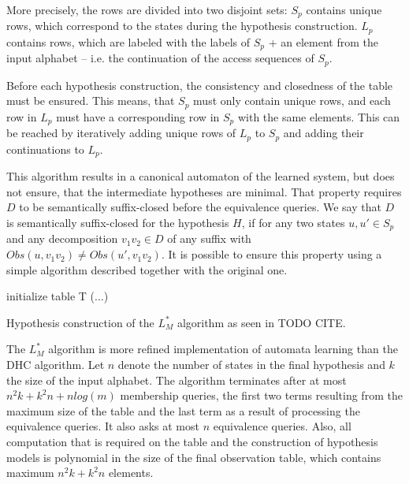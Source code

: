 More precisely, the rows are divided into two disjoint sets: $S_p$ contains unique rows, which correspond to the states during the hypothesis construction. $L_p$ contains rows, which are labeled with the labels of $S_p$ + an element from the input alphabet -- i.e. the continuation of the access sequences of $S_p$.

Before each hypothesis construction, the consistency and closedness of the table must be ensured. This means, that $S_p$ must only contain unique rows, and each row in $L_p$ must have a corresponding row in $S_p$ with the same elements. This can be reached by iteratively adding unique rows of $L_p$ to $S_p$ and adding their continuations to $L_p$. 

This algorithm results in a canonical automaton of the learned system, but does not ensure, that the intermediate hypotheses are minimal. That property requires $D$ to be semantically suffix-closed before the equivalence queries. We say that $D$ is semantically suffix-closed for the hypothesis $H$, if for any two states $u, u' \in S_p$ and any decomposition $v_1 v_2 \in D$ of any suffix with $Obs(u, v_1 v_2) \neq Obs(u', v_1 v_2)$. It is possible to ensure this property using a simple algorithm described together with the original one.

\begin{algorithm}[H]
	\SetAlgoLined
	\DontPrintSemicolon
	initialize table T (...) \\
	\;
	\caption{Hypothesis construction of the $L^*_M$ algorithm as seen in TODO CITE.}
	\label{algo:lstar}
\end{algorithm}

The $L^*_M$ algorithm is more refined implementation of automata learning than the DHC algorithm. Let $n$ denote the number of states in the final hypothesis and $k$ the size of the input alphabet. The algorithm terminates after at most $n^2k + k^2n + nlog(m)$ membership queries, the first two terms resulting from the maximum size of the table and the last term as a result of processing the equivalence queries. It also asks at most $n$ equivalence queries. Also, all computation that is required on the table and the construction of hypothesis models is polynomial in the size of the final observation table, which contains maximum $n^2k + k^2n$ elements.

